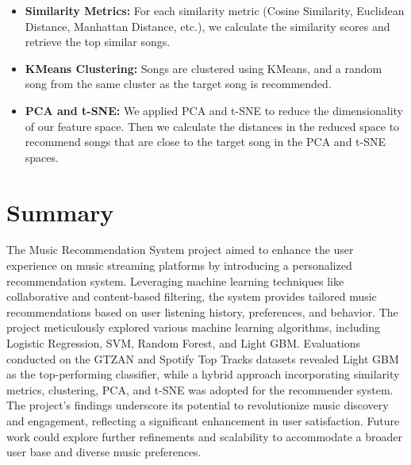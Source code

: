 \documentclass[a4paper, 24pt]{article}
\begin{document}
\begin{itemize}
    \item \textbf{Similarity Metrics:} For each similarity metric (Cosine Similarity, Euclidean Distance, Manhattan Distance, etc.), we calculate the similarity scores and retrieve the top similar songs.
    
    \item \textbf{KMeans Clustering:} Songs are clustered using KMeans, and a random song from the same cluster as the target song is recommended.
    
    \item \textbf{PCA and t-SNE:} We applied PCA and t-SNE to reduce the dimensionality of our feature space. Then we calculate the distances in the reduced space to recommend songs that are close to the target song in the PCA and t-SNE spaces.
\end{itemize}

\section{Summary}
\label{sec:summary}
The Music Recommendation System project aimed to enhance the user experience on music streaming platforms by introducing a personalized recommendation system. Leveraging machine learning techniques like collaborative and content-based filtering, the system provides tailored music recommendations based on user listening history, preferences, and behavior. The project meticulously explored various machine learning algorithms, including Logistic Regression, SVM, Random Forest, and Light GBM. Evaluations conducted on the GTZAN and Spotify Top Tracks datasets revealed Light GBM as the top-performing classifier, while a hybrid approach incorporating similarity metrics, clustering, PCA, and t-SNE was adopted for the recommender system. The project's findings underscore its potential to revolutionize music discovery and engagement, reflecting a significant enhancement in user satisfaction. Future work could explore further refinements and scalability to accommodate a broader user base and diverse music preferences.



\newpage

\appendix
\end{document}
